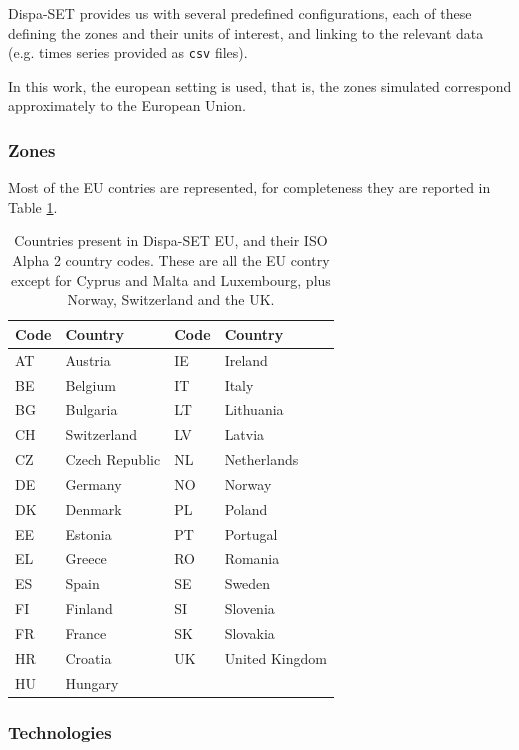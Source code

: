 Dispa-SET provides us with several predefined configurations, each of these defining the zones and their units of interest, and linking to the relevant data (e.g. times series provided as \texttt{csv} files).

In this work, the european setting is used, that is, the zones simulated correspond approximately to the European Union.

\subsubsection{Zones}

Most of the EU contries are represented, for completeness they are reported in Table \ref{table:countries-eu}.

\begin{table}[h]
    \centering
	\begin{tabular}{|l l|l l|}
		\hline
		Code & Country & Code & Country \\
		\hline
		AT & Austria        & IE & Ireland \\
		BE & Belgium        & IT & Italy \\
		BG & Bulgaria       & LT & Lithuania \\
		CH & Switzerland    & LV & Latvia \\
		CZ & Czech Republic & NL & Netherlands \\
		DE & Germany        & NO & Norway \\
		DK & Denmark        & PL & Poland \\
		EE & Estonia        & PT & Portugal \\
		EL & Greece         & RO & Romania \\
		ES & Spain          & SE & Sweden \\
		FI & Finland        & SI & Slovenia \\
		FR & France         & SK & Slovakia \\
		HR & Croatia        & UK & United Kingdom \\
		HU & Hungary        & & \\
		\hline
	\end{tabular}
	\caption{Countries present in Dispa-SET EU, and their ISO Alpha 2 country codes. These are all the EU contry except for Cyprus and Malta and Luxembourg, plus Norway, Switzerland and the UK.}
	\label{table:countries-eu}
\end{table}

\subsubsection{Technologies}

